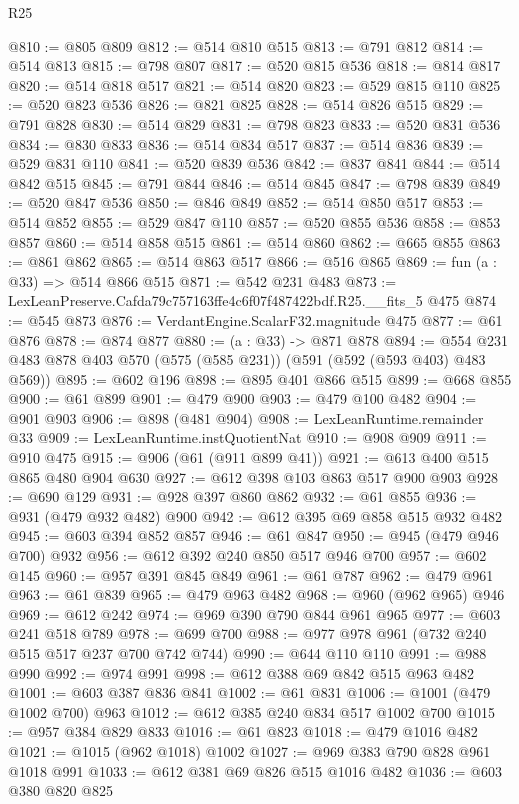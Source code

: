 \begin{lexlean}{R25}
\begin{coremodule}
@810 := @805 @809
@812 := @514 @810 @515
@813 := @791 @812
@814 := @514 @813
@815 := @798 @807
@817 := @520 @815 @536
@818 := @814 @817
@820 := @514 @818 @517
@821 := @514 @820
@823 := @529 @815 @110
@825 := @520 @823 @536
@826 := @821 @825
@828 := @514 @826 @515
@829 := @791 @828
@830 := @514 @829
@831 := @798 @823
@833 := @520 @831 @536
@834 := @830 @833
@836 := @514 @834 @517
@837 := @514 @836
@839 := @529 @831 @110
@841 := @520 @839 @536
@842 := @837 @841
@844 := @514 @842 @515
@845 := @791 @844
@846 := @514 @845
@847 := @798 @839
@849 := @520 @847 @536
@850 := @846 @849
@852 := @514 @850 @517
@853 := @514 @852
@855 := @529 @847 @110
@857 := @520 @855 @536
@858 := @853 @857
@860 := @514 @858 @515
@861 := @514 @860
@862 := @665 @855
@863 := @861 @862
@865 := @514 @863 @517
@866 := @516 @865
@869 := fun (a : @33) => @514 @866 @515
@871 := @542 @231 @483
@873 := LexLeanPreserve.Cafda79c757163ffe4c6f07f487422bdf.R25.__fits_5 @475
@874 := @545 @873
@876 := VerdantEngine.ScalarF32.magnitude @475
@877 := @61 @876
@878 := @874 @877
@880 := (a : @33) -> @871 @878
@894 := @554 @231 @483 @878 @403 @570 (@575 (@585 @231)) (@591 (@592 (@593 @403) @483 @569))
@895 := @602 @196
@898 := @895 @401 @866 @515
@899 := @668 @855
@900 := @61 @899
@901 := @479 @900
@903 := @479 @100 @482
@904 := @901 @903
@906 := @898 (@481 @904)
@908 := LexLeanRuntime.remainder @33
@909 := LexLeanRuntime.instQuotientNat
@910 := @908 @909
@911 := @910 @475
@915 := @906 (@61 (@911 @899 @41))
@921 := @613 @400 @515 @865 @480 @904 @630
@927 := @612 @398 @103 @863 @517 @900 @903
@928 := @690 @129
@931 := @928 @397 @860 @862
@932 := @61 @855
@936 := @931 (@479 @932 @482) @900
@942 := @612 @395 @69 @858 @515 @932 @482
@945 := @603 @394 @852 @857
@946 := @61 @847
@950 := @945 (@479 @946 @700) @932
@956 := @612 @392 @240 @850 @517 @946 @700
@957 := @602 @145
@960 := @957 @391 @845 @849
@961 := @61 @787
@962 := @479 @961
@963 := @61 @839
@965 := @479 @963 @482
@968 := @960 (@962 @965) @946
@969 := @612 @242
@974 := @969 @390 @790 @844 @961 @965
@977 := @603 @241 @518 @789
@978 := @699 @700
@988 := @977 @978 @961 (@732 @240 @515 @517 @237 @700 @742 @744)
@990 := @644 @110 @110
@991 := @988 @990
@992 := @974 @991
@998 := @612 @388 @69 @842 @515 @963 @482
@1001 := @603 @387 @836 @841
@1002 := @61 @831
@1006 := @1001 (@479 @1002 @700) @963
@1012 := @612 @385 @240 @834 @517 @1002 @700
@1015 := @957 @384 @829 @833
@1016 := @61 @823
@1018 := @479 @1016 @482
@1021 := @1015 (@962 @1018) @1002
@1027 := @969 @383 @790 @828 @961 @1018 @991
@1033 := @612 @381 @69 @826 @515 @1016 @482
@1036 := @603 @380 @820 @825

\end{coremodule}
\end{lexlean}
